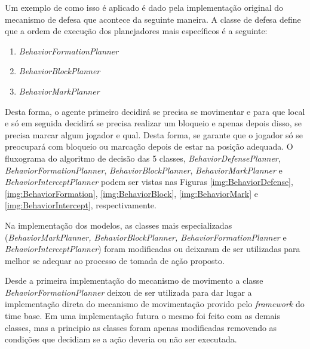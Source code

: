 
Um exemplo de como isso é aplicado é dado pela implementação original do
mecanismo de defesa que acontece da seguinte maneira. A classe de defesa define
que a ordem de execução dos planejadores mais específicos é a seguinte:

\begin{enumerate}
    \item \textit{BehaviorFormationPlanner}
    \item \textit{BehaviorBlockPlanner}
    \item \textit{BehaviorMarkPlanner}
\end{enumerate}

Desta forma, o agente primeiro decidirá se precisa se movimentar e para que
local e só em seguida decidirá se precisa realizar um bloqueio e apenas depois
disso, se precisa marcar algum jogador e qual. Desta forma, se garante que o
jogador só se preocupará com bloqueio ou marcação depois de estar na posição
adequada. O fluxograma do algoritmo de decisão das 5 classes,
\textit{BehaviorDefensePlanner}, \textit{BehaviorFormationPlanner},
\textit{BehaviorBlockPlanner}, \textit{BehaviorMarkPlanner}
e \textit{BehaviorInterceptPlanner} podem ser vistas nas
Figuras \ref{img:BehaviorDefense}, \ref{img:BehaviorFormation},
\ref{img:BehaviorBlock}, \ref{img:BehaviorMark} e \ref{img:BehaviorIntercept}, respectivamente.


Na implementação dos modelos, as classes mais especializadas
(\textit{BehaviorMarkPlanner, BehaviorBlockPlanner, BehaviorFormationPlanner} e
\textit{BehaviorInterceptPlanner}) foram modificadas ou deixaram de ser
utilizadas para melhor se adequar ao processo de tomada de ação proposto.

Desde a primeira implementação do mecanismo de movimento a classe
\textit{BehaviorFormationPlanner} deixou de ser utilizada para dar lugar a
implementação direta do mecanismo de movimentação provido pelo
\textit{framework} do time base. Em uma implementação futura o mesmo foi feito
com as demais classes, mas a principio as classes foram apenas modificadas
removendo as condições que decidiam se a ação deveria ou não ser executada.

